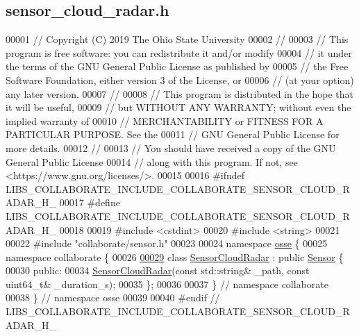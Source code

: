\hypertarget{sensor__cloud__radar_8h_source}{}\subsection{sensor\+\_\+cloud\+\_\+radar.\+h}
\label{sensor__cloud__radar_8h_source}

\begin{DoxyCode}
00001 \textcolor{comment}{// Copyright (C) 2019 The Ohio State University}
00002 \textcolor{comment}{//}
00003 \textcolor{comment}{// This program is free software: you can redistribute it and/or modify}
00004 \textcolor{comment}{// it under the terms of the GNU General Public License as published by}
00005 \textcolor{comment}{// the Free Software Foundation, either version 3 of the License, or}
00006 \textcolor{comment}{// (at your option) any later version.}
00007 \textcolor{comment}{//}
00008 \textcolor{comment}{// This program is distributed in the hope that it will be useful,}
00009 \textcolor{comment}{// but WITHOUT ANY WARRANTY; without even the implied warranty of}
00010 \textcolor{comment}{// MERCHANTABILITY or FITNESS FOR A PARTICULAR PURPOSE.  See the}
00011 \textcolor{comment}{// GNU General Public License for more details.}
00012 \textcolor{comment}{//}
00013 \textcolor{comment}{// You should have received a copy of the GNU General Public License}
00014 \textcolor{comment}{// along with this program.  If not, see <https://www.gnu.org/licenses/>.}
00015 
00016 \textcolor{preprocessor}{#ifndef LIBS\_COLLABORATE\_INCLUDE\_COLLABORATE\_SENSOR\_CLOUD\_RADAR\_H\_}
00017 \textcolor{preprocessor}{#define LIBS\_COLLABORATE\_INCLUDE\_COLLABORATE\_SENSOR\_CLOUD\_RADAR\_H\_}
00018 
00019 \textcolor{preprocessor}{#include <cstdint>}
00020 \textcolor{preprocessor}{#include <string>}
00021 
00022 \textcolor{preprocessor}{#include "collaborate/sensor.h"}
00023 
00024 \textcolor{keyword}{namespace }\hyperlink{namespaceosse}{osse} \{
00025 \textcolor{keyword}{namespace }collaborate \{
00026 
\hyperlink{classosse_1_1collaborate_1_1_sensor_cloud_radar}{00029} \textcolor{keyword}{class }\hyperlink{classosse_1_1collaborate_1_1_sensor_cloud_radar}{SensorCloudRadar} : \textcolor{keyword}{public} \hyperlink{classosse_1_1collaborate_1_1_sensor}{Sensor} \{
00030  \textcolor{keyword}{public}:
00034   \hyperlink{classosse_1_1collaborate_1_1_sensor_cloud_radar_aa23eab08fd54a881f9a85f1b35616386}{SensorCloudRadar}(\textcolor{keyword}{const} std::string& \_path, \textcolor{keyword}{const} uint64\_t& \_duration\_s);
00035 \};
00036 
00037 \}  \textcolor{comment}{// namespace collaborate}
00038 \}  \textcolor{comment}{// namespace osse}
00039 
00040 \textcolor{preprocessor}{#endif  // LIBS\_COLLABORATE\_INCLUDE\_COLLABORATE\_SENSOR\_CLOUD\_RADAR\_H\_}
\end{DoxyCode}
